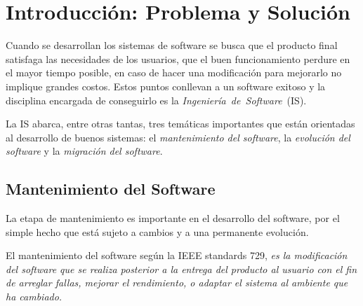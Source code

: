 \documentclass[a4paper,12pt]{report}
\begin{document}
%

\tableofcontents %


\chapter{Introducción: Problema y Solución}

Cuando se desarrollan los sistemas de software se busca que el producto final satisfaga las necesidades de los usuarios, que el buen funcionamiento perdure en el mayor tiempo posible, en caso de hacer una modificación para mejorarlo no implique grandes costos. Estos puntos conllevan a un software exitoso y la disciplina encargada de conseguirlo es la \mbox{\textit{Ingeniería de Software} (IS).}

La IS abarca, entre otras tantas, tres temáticas importantes que están orientadas al desarrollo de buenos sistemas: el \textit{mantenimiento del software}, la \textit{evolución del software} y la \textit{migración del software}. 

\section{Mantenimiento del Software}

La etapa de mantenimiento es importante en el desarrollo del software, por el simple hecho que está sujeto a cambios y a una permanente \mbox{evolución\cite{PFT02}.}

El mantenimiento del software según la IEEE standards 729, \textit{es la mo\-dificación del software que se realiza posterior a la entrega del producto al usuario con el fin de arreglar fallas, mejorar el rendimiento, o adaptar el sistema al ambiente que ha cambiado.}
\end{document}
